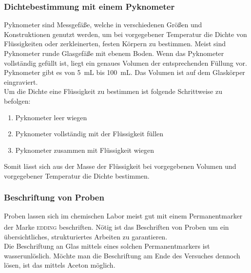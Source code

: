 \subsubsection*{Dichtebestimmung mit einem Pyknometer}
Pyknometer sind Messgefäße, welche in verschiedenen Größen und Konstruktionen genutzt werden, um bei vorgegebener Temperatur die Dichte von Flüssigkeiten oder zerkleinerten, festen Körpern zu bestimmen. Meist sind Pyknometer runde Glasgefäße mit ebenem Boden. Wenn das Pyknometer vollständig gefüllt ist, liegt ein genaues Volumen der entsprechenden Füllung vor. Pyknometer gibt es von \SI{5}{\milli \liter} bis \SI{100}{\milli \liter}. Das Volumen ist auf dem Glaskörper eingraviert.\\
Um die Dichte eine Flüssigkeit zu bestimmen ist folgende Schrittweise zu befolgen:
\begin{enumerate}
	\item Pyknometer leer wiegen
	\item Pyknometer vollständig mit der Flüssigkeit füllen
	\item Pyknometer zusammen mit Flüssigkeit wiegen
\end{enumerate}
Somit lässt sich aus der Masse der Flüssigkeit bei vorgegebenen Volumen und vorgegebener Temperatur die Dichte bestimmen.

\subsubsection*{Beschriftung von Proben}
Proben lassen sich im chemischen Labor meist gut mit einem Permanentmarker der Marke  \textsc{edding}\textsuperscript{\textregistered} beschriften.  Nötig ist das Beschriften von Proben um ein übersichtliches, strukturiertes Arbeiten zu garantieren. \\
Die Beschriftung an Glas mittels eines solchen Permanentmarkers ist wasserunlöslich. Möchte man die Beschriftung am Ende des Versuches dennoch lösen, ist das mittels Aceton möglich. 

